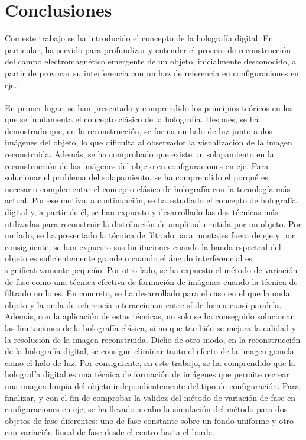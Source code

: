 \documentclass[12pt]{article}
\begin{document}
\section{Conclusiones}
Con este trabajo se ha introducido el concepto de la holografía digital. En particular, ha servido para profundizar y entender  el proceso de reconstrucción del campo electromagnético emergente de un objeto, inicialmente desconocido, a partir de provocar su interferencia con un haz de referencia en configuraciones en eje.  \\ \\ 
En primer lugar, se han presentado y comprendido  los principios teóricos en los que se fundamenta el concepto clásico de la holografía. Después, se ha demostrado que, en la reconstrucción, se forma un halo de luz junto a dos imágenes del objeto, lo que dificulta  al observador la visualización de la imagen reconstruida. Además, se ha comprobado que existe un solapamiento en la reconstrucción de las imágenes  del objeto en configuraciones en eje. Para solucionar el problema del solapamiento, se ha comprendido el porqué es necesario complementar el concepto clásico de holografía  con  la tecnología más actual. Por ese motivo, a continuación, se ha estudiado el concepto de holografía digital y, a partir de él, se han expuesto y desarrollado  las dos técnicas más utilizadas para reconstruir la distribución de amplitud emitida por un objeto. Por un lado, se ha presentado la técnica de filtrado para montajes fuera de eje y por consiguiente, se han expuesto sus limitaciones cuando la banda espectral del objeto  es suficientemente grande o cuando el ángulo interferencial es significativamente pequeño. Por otro lado, se ha expuesto  el método de variación de fase como una técnica efectiva de formación de imágenes cuando la técnica de filtrado no lo es. En concreto, se ha desarrollado para el caso en el que la onda objeto y la onda de referencia interaccionan entre sí de forma cuasi paralela. Además, con la aplicación de estas técnicas, no solo se ha conseguido solucionar  las limitaciones  de la holografía clásica, si no que también se mejora la calidad y la resolución de la imagen reconstruida. Dicho de otro modo, en la reconstrucción de la holografía digital, se consigue eliminar tanto el efecto de la imagen gemela como el halo de luz. Por consiguiente, en este trabajo, se ha comprendido que la holografía digital es una técnica de formación de imágenes que permite recrear una imagen limpia del objeto independientemente del  tipo de configuración. Para finalizar, y  con el fin de comprobar la validez del método de variación de fase en configuraciones en eje, se ha  llevado a cabo la simulación del método para  dos objetos de fase diferentes: uno de fase constante sobre un fondo uniforme  y otro con variación lineal de fase desde el centro hasta el borde. \\ \\ 
\end{document}
